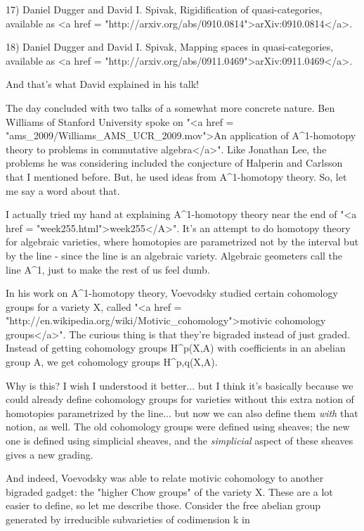 17) Daniel Dugger and David I. Spivak, Rigidification of
quasi-categories, available as <a href = "http://arxiv.org/abs/0910.0814">arXiv:0910.0814</a>.

18) Daniel Dugger and David I. Spivak, Mapping spaces in
quasi-categories, available as <a href = "http://arxiv.org/abs/0911.0469">arXiv:0911.0469</a>.

And that's what David explained in his talk!

The day concluded with two talks of a somewhat more concrete nature.
Ben Williams of Stanford University spoke on "<a href =
"ams_2009/Williams_AMS_UCR_2009.mov">An application of
A^{1}-homotopy theory to problems in commutative
algebra</a>".  Like Jonathan Lee, the problems he was considering
included the conjecture of Halperin and Carlsson that I mentioned
before.  But, he used ideas from A^{1}-homotopy theory.  So,
let me say a word about that.

I actually tried my hand at explaining A^{1}-homotopy theory
near the end of "<a href = "week255.html">week255</A>".
It's an attempt to do homotopy theory for algebraic varieties, where
homotopies are parametrized not by the interval but by the line -
since the line is an algebraic variety.  Algebraic geometers call
the line A^{1}, just to make the rest of us feel dumb.

In his work on A^{1}-homotopy theory, Voevodsky studied
certain cohomology groups for a variety X, called "<a href =
"http://en.wikipedia.org/wiki/Motivic_cohomology">motivic cohomology
groups</a>".  The curious thing is that they're bigraded instead
of just graded.  Instead of getting cohomology groups
H^{p}(X,A) with coefficients in an abelian group A, we get
cohomology groups H^{p,q}(X,A).

Why is this?  I wish I understood it better... but I think it's
basically because we could already define cohomology groups for
varieties without this extra notion of homotopies parametrized by
the line... but now we can also define them \emph{with} that notion, as
well.  The old cohomology groups were defined using sheaves; the 
new one is defined using simplicial sheaves, and the \emph{simplicial}
aspect of these sheaves gives a new grading.

And indeed, Voevodsky was able to relate motivic cohomology to another
bigraded gadget: the "higher Chow groups" of the variety X.
These are a lot easier to define, so let me describe those.  Consider
the free abelian group generated by irreducible subvarieties of
codimension k in 

